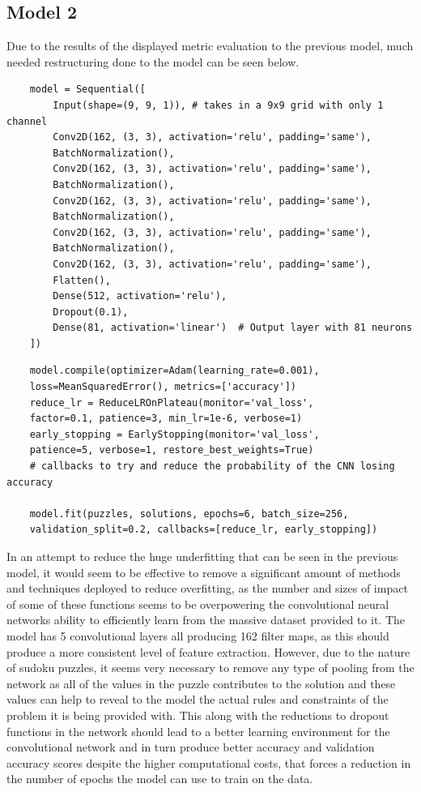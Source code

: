 \documentclass[]{final_report}
\begin{document}
\subsection{Model 2}

Due to the results of the displayed metric evaluation to the previous model, much needed restructuring done to the model can be seen below. 

\begin{verbatim}
    model = Sequential([
        Input(shape=(9, 9, 1)), # takes in a 9x9 grid with only 1 channel
        Conv2D(162, (3, 3), activation='relu', padding='same'),
        BatchNormalization(),
        Conv2D(162, (3, 3), activation='relu', padding='same'),
        BatchNormalization(),
        Conv2D(162, (3, 3), activation='relu', padding='same'),
        BatchNormalization(),
        Conv2D(162, (3, 3), activation='relu', padding='same'),
        BatchNormalization(),
        Conv2D(162, (3, 3), activation='relu', padding='same'),
        Flatten(),
        Dense(512, activation='relu'),
        Dropout(0.1),
        Dense(81, activation='linear')  # Output layer with 81 neurons
    ])
\end{verbatim}

\begin{verbatim}
    model.compile(optimizer=Adam(learning_rate=0.001), 
    loss=MeanSquaredError(), metrics=['accuracy'])
    reduce_lr = ReduceLROnPlateau(monitor='val_loss',
    factor=0.1, patience=3, min_lr=1e-6, verbose=1)
    early_stopping = EarlyStopping(monitor='val_loss',
    patience=5, verbose=1, restore_best_weights=True)
    # callbacks to try and reduce the probability of the CNN losing accuracy

    model.fit(puzzles, solutions, epochs=6, batch_size=256, 
    validation_split=0.2, callbacks=[reduce_lr, early_stopping])
\end{verbatim}

In an attempt to reduce the huge underfitting that can be seen in the previous model, it would seem to be effective to remove a significant amount of methods and techniques deployed to reduce overfitting, as the number and sizes of impact of some of these functions seems to be overpowering the convolutional neural networks ability to efficiently learn from the massive dataset provided to it. The model has 5 convolutional layers all producing 162 filter maps, as this should produce a more consistent level of feature extraction. However, due to the nature of sudoku puzzles, it seems very necessary to remove any type of pooling from the network as all of the values in the puzzle contributes to the solution and these values can help to reveal to the model the actual rules and constraints of the problem it is being provided with. This along with the reductions to dropout functions in the network should lead to a better learning environment for the convolutional network and in turn produce better accuracy and validation accuracy scores despite the higher computational costs, that forces a reduction in the number of epochs the model can use to train on the data. 
\end{document}

